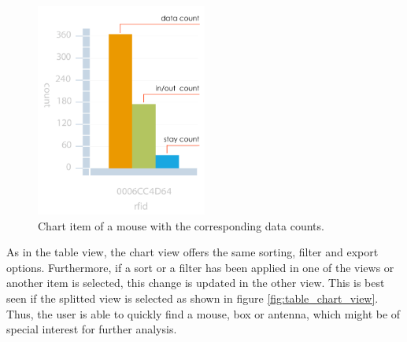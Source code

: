 \begin{figure}[htpb]
\begin{center}
  \includegraphics[width=0.5\textwidth]{assets/pdf/mouse_chart_item.pdf}
  \caption[Chart item of a mouse]{Chart item of a mouse with the corresponding data counts.}
  \label{fig:mouse_chart_item}
\end{center}
\end{figure}


As in the table view, the chart view offers the same sorting, filter and export options. Furthermore, if a sort or a filter has been applied in one of the views or another item is selected, this change is updated in the other view. This is best seen if the splitted view is selected as shown in figure \ref{fig:table_chart_view}. Thus, the user is able to quickly find a mouse, box or antenna, which might be of special interest for further analysis.

